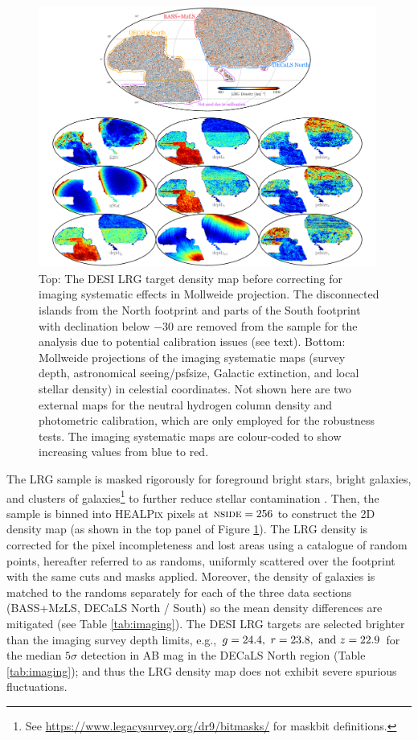 \begin{figure}
 \centering
 \includegraphics[width=0.99\textwidth]{figures/dr9data.pdf}
 \caption{Top: The DESI LRG target density map before correcting for imaging systematic effects in Mollweide projection. The disconnected islands from the North footprint and parts of the South footprint with declination below $-30$ are removed from the sample for the analysis due to potential calibration issues (see text). Bottom: Mollweide projections of the imaging systematic maps (survey depth, astronomical seeing/psfsize, Galactic extinction, and local stellar density) in celestial coordinates. Not shown here are two external maps for the neutral hydrogen column density and photometric calibration, which are only employed for the robustness tests. The imaging systematic maps are colour-coded to show increasing values from blue to red.}
 \label{fig:ng}
\end{figure}

The LRG sample is masked rigorously for foreground bright stars, bright galaxies, and clusters of galaxies\footnote{See \url{https://www.legacysurvey.org/dr9/bitmasks/} for maskbit definitions.} to further reduce stellar contamination \citep{zhou2022target}. Then, the sample is binned into \textsc{HEALPix} \citep{gorski2005healpix} pixels at $\textsc{nside}=256$ to construct the 2D density map (as shown in the top panel of Figure \ref{fig:ng}). The LRG density is corrected for the pixel incompleteness and lost areas using a catalogue of random points, hereafter referred to as randoms, uniformly scattered over the footprint with the same cuts and masks applied. Moreover, the density of galaxies is matched to the randoms separately for each of the three data sections (BASS+MzLS, DECaLS North / South) so the mean density differences are mitigated (see Table \ref{tab:imaging}). The DESI LRG targets are selected brighter than the imaging survey depth limits, e.g., $g=24.4,~r=23.8,~{\rm and}~z=22.9$ for the median $5\sigma$ detection in AB mag in the DECaLS North region (Table \ref{tab:imaging}); and thus the LRG density map does not exhibit severe spurious fluctuations.

